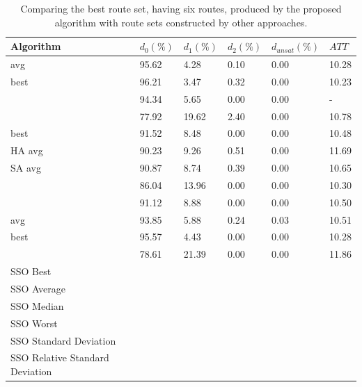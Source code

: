     \begin{table}[H]
    \centering
    \hspace*{-1.0cm}
    \begin{tabular}{|l||l|l|l|l|l|}
    \hline
    Algorithm & $d_0(\%)$ & $d_1(\%)$ & $d_2(\%)$ & $d_{unsat}(\%)$ & $ATT$ \\
    \hline
    \citet{kechagiopoulos14} avg & 95.62 & 4.28 & 0.10 & 0.00 & 10.28 \\
    \citet{kechagiopoulos14} best & 96.21 & 3.47 & 0.32 & 0.00 & 10.23 \\
    \citet{nikolic14} & 94.34 & 5.65 & 0.00 & 0.00 & - \\
    \citet{kidwai98} & 77.92 & 19.62 & 2.40 & 0.00 & 10.78 \\
    \citet{fan10} best & 91.52 & 8.48 & 0.00 & 0.00 & 10.48  \\
    \citet{fan10} HA avg & 90.23 & 9.26 & 0.51 & 0.00 & 11.69 \\
    \citet{fan10} SA avg & 90.87 & 8.74 & 0.39 & 0.00 & 10.65 \\
    \citet{chakroborty02} & 86.04 & 13.96 & 0.00 & 0.00 & 10.30 \\
    \citet{zhang10} & 91.12 & 8.88 & 0.00 & 0.00 & 10.50 \\
    \citet{chew12} avg & 93.85 & 5.88 & 0.24 & 0.03 & 10.51 \\
    \citet{chew12} best & 95.57 & 4.43 & 0.00 & 0.00 & 10.28 \\
    \citet{baaj91} & 78.61 & 21.39 & 0.00 & 0.00 & 11.86 \\
    \hline
    \hline
    SSO Best & ~ & ~ & ~ & ~ & ~ \\
    SSO Average & ~ & ~ & ~ & ~ & ~ \\
    SSO Median & ~ & ~ & ~ & ~ & ~ \\
    SSO Worst & ~ & ~ & ~ & ~ & ~ \\
    SSO Standard Deviation & ~ & ~ & ~ & ~ & ~ \\
    SSO Relative Standard Deviation & ~ & ~ & ~ & ~ & ~ \\
    \hline
    \end{tabular}
    \caption {Comparing the best route set, having six routes, produced by the proposed algorithm with route sets constructed by other approaches.}
    \label{table:performanceComparison_6}
    \end{table}



